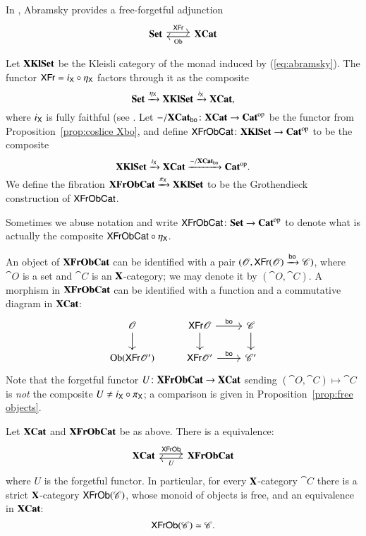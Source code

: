 \documentclass[12pt,oneside,article,draft]{memoir}
\begin{document}
In \cite{Abramsky}, Abramsky provides a free-forgetful adjunction
\begin{equation}\label{eq:abramsky}
\begin{tikzcd}
\Cat{Set}\arrow[r, shift left=.5ex, "\Fun{XFr}"]&\XCat\arrow[l, shift left=.5ex,"\Ob"]
\end{tikzcd}
\end{equation}

\begin{definition}\label{def:XKlSet XFrObCat}

Let $\mathbf{XKlSet}$ be the Kleisli category of the monad induced by (\ref{eq:abramsky}). The functor $\mathsf{XFr}=i_{\mathsf{X}}\circ\eta_{\mathsf{X}}$ factors through it as the composite 
$$\mathbf{Set}\xrightarrow{\eta_{\mathsf{X}}}\mathbf{XKlSet}\xrightarrow{i_{\mathsf{X}}}\mathbf{XCat},$$ 
where $i_{\mathsf{X}}$ is fully faithful (see \cite[Proposition 4.2.1]{Borceux vol 2}.  Let $-/\mathbf{XCat}_{\mathsf{bo}}\colon\mathbf{XCat}\to{\mathbf{Cat}}^{\text{op}}$ be the functor from Proposition~\ref{prop:coslice Xbo}, and define $\mathsf{XFrObCat}\colon\mathbf{XKlSet}\to{\mathbf{Cat}}^{\text{op}}$ to be the composite
$$\mathbf{XKlSet}\xrightarrow{i_{\mathsf{X}}}\mathbf{XCat}\xrightarrow{-/\mathbf{XCat}_{\mathsf{bo}}}{\mathbf{Cat}}^{\text{op}}.$$
We define the fibration $\mathbf{XFrObCat}\xrightarrow{\pi_{\mathsf{X}}}\mathbf{XKlSet}$ to be the Grothendieck construction of $\mathsf{XFrObCat}$. 

Sometimes we abuse notation and write $\mathsf{XFrObCat}\colon\mathbf{Set}\to{\mathbf{Cat}}^{\text{op}}$ to denote what is actually the composite $\mathsf{XFrObCat}\circ\eta_{\mathsf{X}}$.

\end{definition}

An object of $\mathbf{XFrObCat}$ can be identified with a pair $(\mathscr{O},\mathsf{XFr}(\mathscr{O})\xrightarrow{\mathsf{bo}}\mathscr{C})$, where $\cat{O}$ is a set and $\cat{C}$ is an $\mathbf{X}$-category; we may denote it by $(\cat{O},\cat{C})$. A morphism in $\mathbf{XFrObCat}$ can be identified with a function and a commutative diagram in $\mathbf{XCat}$:
$$
\begin{tikzcd}
\cat{O}\ar[d]&\Fun{XFr}\cat{O}\ar[r,"\bo"]\ar[d]&\cat{C}\ar[d]\\
\Ob(\Fun{XFr}\cat{O'})&\Fun{XFr}\cat{O'}\ar[r,"\bo"]&\cat{C'}
\end{tikzcd}
$$
Note that the forgetful functor $U\colon\mathbf{XFrObCat}\to\mathbf{XCat}$ sending $(\cat{O},\cat{C})\mapsto\cat{C}$ is \emph{not} the composite $U\neq i_{\mathsf{X}}\circ\pi_{\mathsf{X}}$; a comparison is given in Proposition~\ref{prop:free objects}.

\begin{proposition}\label{prop:free objects}

Let $\mathbf{XCat}$ and $\mathbf{XFrObCat}$ be as above. There is a equivalence:
$$
\begin{tikzcd}
\XCat\arrow[r, shift left=.5ex, "\Fun{XFrOb}"]&\Cat{XFrObCat}\arrow[l, shift left=.5ex,"U"]
\end{tikzcd}
$$
where $U$ is the forgetful functor. In particular, for every $\mathbf{X}$-category $\cat{C}$ there is a strict $\mathbf{X}$-category $\mathsf{XFrOb}(\mathscr{C})$, whose monoid of objects is free, and an equivalence in $\mathbf{XCat}$:
$$\mathsf{XFrOb}(\mathscr{C})\simeq\mathscr{C}.$$

\end{proposition}
\end{document}
